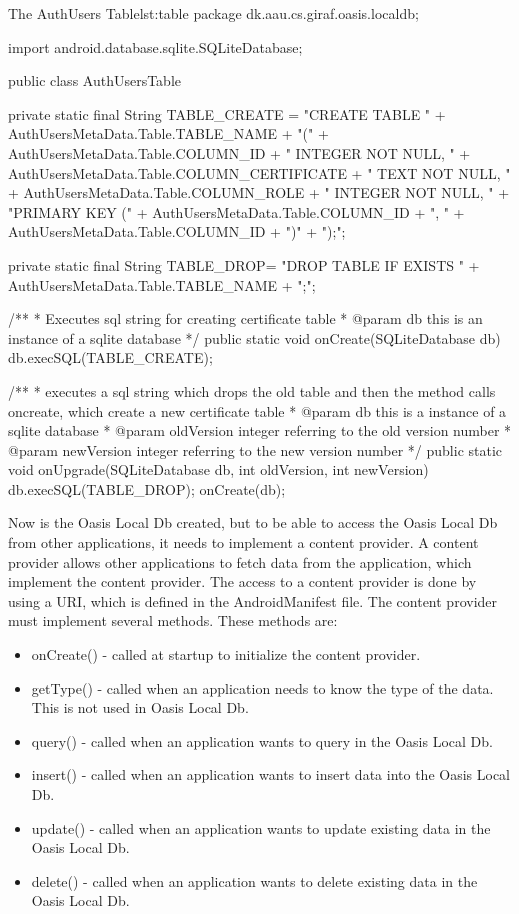 \begin{Java}{The AuthUsers Table}{lst:table}
package dk.aau.cs.giraf.oasis.localdb;

import android.database.sqlite.SQLiteDatabase;

public class AuthUsersTable {

	private static final String TABLE_CREATE = "CREATE TABLE "
			+ AuthUsersMetaData.Table.TABLE_NAME
			+ "("
			+ AuthUsersMetaData.Table.COLUMN_ID + " INTEGER NOT NULL, "
			+ AuthUsersMetaData.Table.COLUMN_CERTIFICATE + " TEXT NOT NULL, "
			+ AuthUsersMetaData.Table.COLUMN_ROLE + " INTEGER NOT NULL, "
			+ "PRIMARY KEY (" + AuthUsersMetaData.Table.COLUMN_ID + ", " + AuthUsersMetaData.Table.COLUMN_ID + ")"
			+ ");";

	private static final String TABLE_DROP= "DROP TABLE IF EXISTS " + AuthUsersMetaData.Table.TABLE_NAME + ";";

	/**
	 * Executes sql string for creating certificate table
	 * @param db this is an instance of a sqlite database
	 */
	public static void onCreate(SQLiteDatabase db) {
		db.execSQL(TABLE_CREATE);
	}

	/**
	 * executes a sql string which drops the old table and then the method calls oncreate, which create a new certificate table
	 * @param db this is a instance of a sqlite database
	 * @param oldVersion integer referring to the old version number
	 * @param newVersion integer referring to the new version number
	 */
	public static void onUpgrade(SQLiteDatabase db, int oldVersion, int newVersion) {
		db.execSQL(TABLE_DROP);
		onCreate(db);
	}
}
\end{Java}

Now is the Oasis Local Db created, but to be able to access the Oasis Local Db from other applications, it needs to implement a content provider. A content provider allows other applications to fetch data from the application, which implement the content provider. The access to a content provider is done by using a URI, which is defined in the AndroidManifest file. The content provider must implement several methods. These methods are:

\begin{itemize}
	\item onCreate() - called at startup to initialize the content provider.
	\item getType() - called when an application needs to know the type of the data. This is not used in Oasis Local Db.
	\item query() - called when an application wants to query in the Oasis Local Db.
	\item insert() - called when an application wants to insert data into the Oasis Local Db.
	\item update() - called when an application wants to update existing data in the Oasis Local Db.
	\item delete() - called when an application wants to delete existing data in the Oasis Local Db.
\end{itemize}

